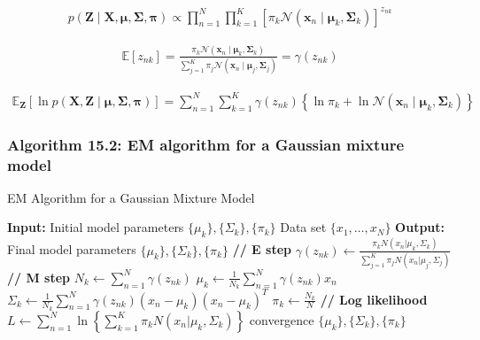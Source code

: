 \documentclass{article}
\begin{document}
\begin{align*}
p(\mathbf{Z} \mid \mathbf{X}, \boldsymbol{\mu}, \boldsymbol{\Sigma}, \boldsymbol{\pi}) \propto \prod_{n=1}^{N} \prod_{k=1}^{K}\left[
\pi_{k} \mathcal{N}\left(\mathbf{x}_{n} \mid \boldsymbol{\mu}_{k}, \boldsymbol{\Sigma}_{k}\right)\right]^{z_{n k}} 
\tag{15.28}
\end{align*}

\begin{align*}
\mathbb{E}\left[
z_{n k}\right]=\frac{\pi_{k} \mathcal{N}\left(\mathbf{x}_{n} \mid \boldsymbol{\mu}_{k}, \boldsymbol{\Sigma}_{k}\right)}{\sum_{j=1}^{K} \pi_{j} \mathcal{N}\left(\mathbf{x}_{n} \mid \boldsymbol{\mu}_{j}, \boldsymbol{\Sigma}_{j}\right)}=\gamma\left(z_{n k}\right) 
\tag{15.29}
\end{align*}

\begin{align*}
\mathbb{E}_{\mathbf{Z}}[\ln p(\mathbf{X}, \mathbf{Z} \mid \boldsymbol{\mu}, \boldsymbol{\Sigma}, \boldsymbol{\pi})]=\sum_{n=1}^{N} \sum_{k=1}^{K} \gamma\left(z_{n k}\right)\left\{\ln \pi_{k}+\ln \mathcal{N}\left(\mathbf{x}_{n} \mid \boldsymbol{\mu}_{k}, \boldsymbol{\Sigma}_{k}\right)\right\} 
\tag{15.30}
\end{align*}

\subsubsection{Algorithm 15.2: EM algorithm for a Gaussian mixture model}

\begin{algorithm}[H]
\caption{EM Algorithm for a Gaussian Mixture Model}
\begin{algorithmic}[1]
\STATE \textbf{Input:} Initial model parameters $\{\mu_k\}, \{\Sigma_k\}, \{\pi_k\}$
\STATE \quad Data set $\{x_1, \ldots, x_N\}$
\STATE \textbf{Output:} Final model parameters $\{\mu_k\}, \{\Sigma_k\}, \{\pi_k\}$
\REPEAT
    \STATE \textbf{// E step}
            \STATE $\gamma(z_{nk}) \gets \frac{\pi_k N(x_n | \mu_k, \Sigma_k)}{\sum_{j=1}^{K} \pi_j N(x_n | \mu_j, \Sigma_j)}$
        \ENDFOR
    \ENDFOR
    \STATE \textbf{// M step}
        \STATE $N_k \gets \sum_{n=1}^{N} \gamma(z_{nk})$
        \STATE $\mu_k \gets \frac{1}{N_k} \sum_{n=1}^{N} \gamma(z_{nk}) x_n$
        \STATE $\Sigma_k \gets \frac{1}{N_k} \sum_{n=1}^{N} \gamma(z_{nk}) (x_n - \mu_k)(x_n - \mu_k)^T$
        \STATE $\pi_k \gets \frac{N_k}{N}$
    \ENDFOR
    \STATE \textbf{// Log likelihood}
    \STATE $L \gets \sum_{n=1}^{N} \ln \left\{ \sum_{k=1}^{K} \pi_k N(x_n | \mu_k, \Sigma_k) \right\}$
\UNTIL convergence
\RETURN $\{\mu_k\}, \{\Sigma_k\}, \{\pi_k\}$
\end{algorithmic}
\end{algorithm}
\end{document}

